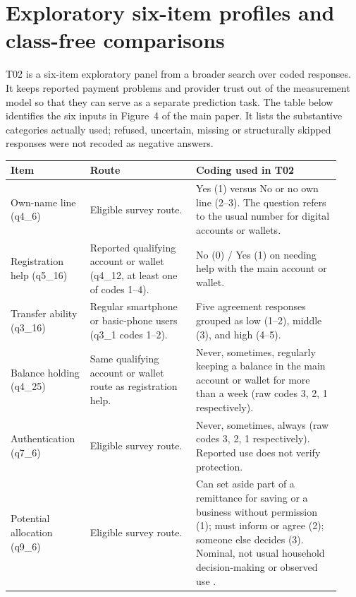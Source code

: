 \section{Exploratory six-item profiles and class-free comparisons}
\label{sec:t02}

T02 is a six-item exploratory panel from a broader search over coded responses. It keeps reported payment problems and provider trust out of the measurement model so that they can serve as a separate prediction task. The table below identifies the six inputs in Figure~4 of the main paper. It lists the substantive categories actually used; refused, uncertain, missing or structurally skipped responses were not recoded as negative answers.

\begingroup
\small\singlespacing
\noindent
\begin{tabular}{@{}
  >{\raggedright\arraybackslash}p{0.22\linewidth}
  >{\raggedright\arraybackslash}p{0.30\linewidth}
  >{\raggedright\arraybackslash}p{0.41\linewidth}@{}}
\toprule
Item & Route & Coding used in T02 \\
\midrule
Own-name line (q4\_6) & Eligible survey route. & Yes (1) versus No or no own line (2--3). The question refers to the usual number for digital accounts or wallets. \\
Registration help (q5\_16) & Reported qualifying account or wallet (q4\_12, at least one of codes 1--4). & No (0) / Yes (1) on needing help with the main account or wallet. \\
Transfer ability (q3\_16) & Regular smartphone or basic-phone users (q3\_1 codes 1--2). & Five agreement responses grouped as low (1--2), middle (3), and high (4--5). \\
Balance holding (q4\_25) & Same qualifying account or wallet route as registration help. & Never, sometimes, regularly keeping a balance in the main account or wallet for more than a week (raw codes 3, 2, 1 respectively). \\
Authentication (q7\_6) & Eligible survey route. & Never, sometimes, always (raw codes 3, 2, 1 respectively). Reported use does not verify protection. \\
Potential allocation (q9\_6) & Eligible survey route. & Can set aside part of a remittance for saving or a business without permission (1); must inform or agree (2); someone else decides (3). Nominal, not usual household decision-making or observed use \citep{kabeer1999}. \\
\bottomrule
\end{tabular}
\par\endgroup

